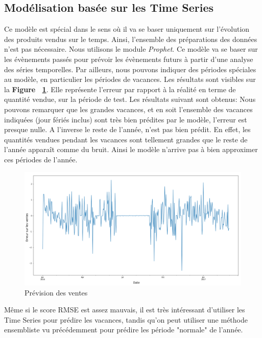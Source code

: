 \documentclass{article} %
\begin{document}
\subsection{Modélisation basée sur les Time Series}
\label{sec:tm}
Ce modèle est spécial dans le sens où il va se baser uniquement sur l'évolution des produits vendus sur le temps. Ainsi, l'ensemble des préparations des données n'est pas nécessaire. Nous utilisons le module \textit{Prophet}. Ce modèle va se baser sur les évènements passés pour prévoir les évènements futurs à partir d'une analyse des séries temporelles. Par ailleurs, nous pouvons indiquer des périodes spéciales au modèle, en particulier les périodes de vacances. Les résultats sont visibles sur la \textbf{Figure ~\ref{fig:venteprev}}. Elle représente l'erreur par rapport à la réalité en terme de quantité vendue, sur la période de test. Les résultats suivant sont obtenus:
Nous pouvons remarquer que les grandes vacances, et en soit l'ensemble des vacances indiquées (jour fériés inclus) sont très bien prédites par le modèle, l'erreur est presque nulle. A l'inverse le reste de l'année, n'est pas bien prédit. En effet, les quantités vendues pendant les vacances sont tellement grandes que le reste de l'année apparaît comme du bruit. Ainsi le modèle n'arrive pas à bien approximer ces périodes de l'année.
\begin{figure}[!h]
	\centering 
	\includegraphics[keepaspectratio = true,scale=0.55]{ventesprevision.png}
	\caption{Prévision des ventes}
	\label{fig:venteprev}
\end{figure}
Même si le score RMSE est assez mauvais, il est très intéressant d'utiliser les Time Series pour prédire les vacances, tandis qu'on peut utiliser une méthode ensembliste vu précédemment pour prédire les période "normale" de l'année.
\end{document}
